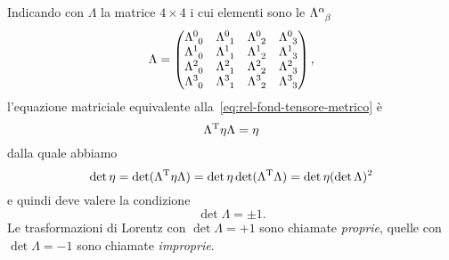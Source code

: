 Indicando con $\Lambda$ la matrice $4 \times 4$ i cui elementi sono le
$\tensor{\Lambda}{^{\alpha}_{\beta}}$
\begin{equation}
  \Lambda =
  \begin{pmatrix}
    \tensor{\Lambda}{^{0}_{0}} & \tensor{\Lambda}{^{0}_{1}} &
    \tensor{\Lambda}{^{0}_{2}} & \tensor{\Lambda}{^{0}_{3}} \\
    \tensor{\Lambda}{^{1}_{0}} & \tensor{\Lambda}{^{1}_{1}} &
    \tensor{\Lambda}{^{1}_{2}} & \tensor{\Lambda}{^{1}_{3}} \\
    \tensor{\Lambda}{^{2}_{0}} & \tensor{\Lambda}{^{2}_{1}} &
    \tensor{\Lambda}{^{2}_{2}} & \tensor{\Lambda}{^{2}_{3}} \\
    \tensor{\Lambda}{^{3}_{0}} & \tensor{\Lambda}{^{3}_{1}} &
    \tensor{\Lambda}{^{3}_{2}} & \tensor{\Lambda}{^{3}_{3}}
  \end{pmatrix},
\end{equation}
l'equazione matriciale equivalente alla~\eqref{eq:rel-fond-tensore-metrico} è
\begin{equation}
  \Lambda^{\textup{T}}\eta\Lambda = \eta
\end{equation}
dalla quale abbiamo
\begin{equation}
  \det\eta = \det(\Lambda^{\textup{T}}\eta\Lambda) = \det\eta
  \det(\Lambda^{\textup{T}}\Lambda) = \det\eta (\det\Lambda)^{2}
\end{equation}
e quindi deve valere la condizione
\begin{equation}
  \det\Lambda = \pm 1.
\end{equation}
Le trasformazioni di Lorentz con $\det\Lambda = +1$ sono chiamate
\emph{proprie}, quelle con $\det\Lambda = -1$ sono chiamate \emph{improprie}.

